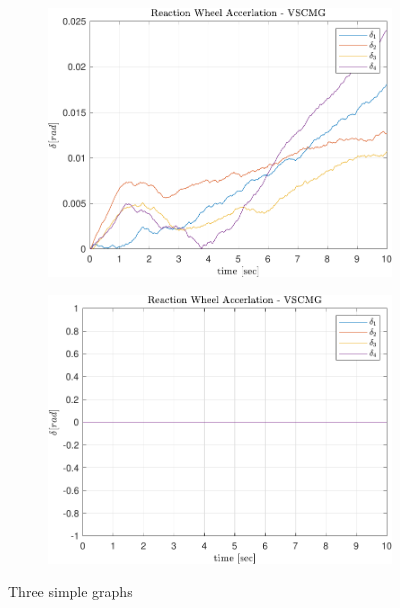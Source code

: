 \begin{figure}[ht]
     \centering
     \begin{subfigure}[b]{0.49\textwidth}
         \centering
         \includegraphics[width=\textwidth]{figures/plots/Results/vs-nn-delta.pdf}
         \label{fig:y equals x}
     \end{subfigure}
     \begin{subfigure}[b]{0.49\textwidth}
         \centering
         \includegraphics[width=\textwidth]{figures/plots/Results/vs-vs-delta.pdf}
         \label{fig:three sin x}
     \end{subfigure}
     
        \caption{Three simple graphs}
        \label{fig:three graphs}
\end{figure}


